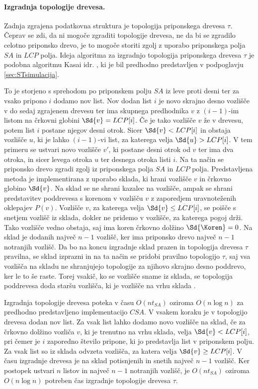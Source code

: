 \paragraph{Izgradnja topologije drevesa.}
Zadnja zgrajena podatkovna struktura je topologija priponskega drevesa $\tau$. Čeprav se zdi, da ni mogoče zgraditi topologije drevesa, ne da bi se zgradilo celotno priponsko drevo, je to mogoče storiti zgolj z uporabo priponskega polja $SA$ in $LCP$ polja. Ideja algoritma za izgradnjo topologija priponskega drevesa $\tau$ je podobna algoritmu Kasai idr. \cite{Kasai2001}, ki je bil predhodno predstavljen v podpoglavju \ref{sec:STsimulacija}.

To je storjeno s sprehodom po priponskem polju $SA$ iz leve proti desni ter za vsako pripono $i$ dodamo nov list. Nov dodan list $i$ je novo skrajno desno vozlišče v do sedaj zgrajenem drevesu ter ima skupnega predhodnika $v$ z $(i-1)$-im listom na črkovni globini $\Sd{v}=LCP[i]$. Če je tako vozlišče $v$ že v drevesu, potem list $i$ postane njegov desni otrok. Sicer $\Sd{v}<LCP[i]$ in obstaja vozlišče $u$, ki je lahko $(i-1)$-vi list, za katerega velja $\Sd{u}>LCP[i]$. V tem primeru se ustvari novo vozlišče $v'$, ki postane desni otrok od $v$ ter ima dva otroka, in sicer levega otroka $u$ ter desnega otroka listi $i$. Na ta način se priponsko drevo zgradi zgolj iz priponskega polja $SA$ in $LCP$ polja. Predstavljena metoda je implementirana z uporabo sklada, ki hrani vozlišče $v$ in črkovno globino $\Sd{v}$. Na sklad se ne shrani kazalec na vozlišče, ampak se shrani predstavitev poddrevesa s korenom v vozlišču $v$ z zaporedjem uravnoteženih oklepajev $P(v)$. Vozlišče $v$, za katerega velja $\Sd{v}\le LCP[i]$, se poišče s snetjem vozlišč iz sklada, dokler ne pridemo v vozlišče, za katerega pogoj drži. Tako vozlišče vedno obstaja, saj ima koren črkovno dolžino $\Sd{\Koren}=0$. Na sklad je dodanih največ $n-1$ vozlišč, ker ima priponsko drevo največ $n-1$ notranjih vozlišč. Da bo na koncu izgradnje sklad prazen in topologija drevesa $\tau$ pravilna, se sklad izprazni in na ta način se pridobi pravilno topologijo $\tau$, saj vsa vozlišča na skladu ne shranjujejo topologije za njihovo skrajno desno poddrevo, ker le to še raste. Torej vsakič, ko se vozlišče sname iz sklada, se topologija poddrevesa doda staršu vozlišča, ki je vozlišče na vrhu sklada \cite{Navarro2016}.

Izgradnja topologije drevesa poteka v času $O(nt_{SA})$ oziroma $O(n\log{n})$ za predhodno predstavljeno implementacijo $CSA$. V vsakem koraku je v topologijo drevesa dodan nov list. Za vsak list lahko dodamo novo vozlišče na sklad, če za črkovno dolžino vozliča $v$, ki je trenutno na vrhu sklada, velja $\Sd{v}<LCP[i]$, pri čemer je $i$ zaporedno število pripone, ki jo predstavlja list v priponskem polju. Za vsak list so iz sklada odvzeta vozlišča, za katera velja $\Sd{v}\ge LCP[i]$. V času izgradnje drevesa je na sklad potisnjenih in snetih največ $n-1$ vozlišč. Ker postopek ustvari $n$ listov in največ $n-1$ notranjih vozlišč, je $O(nt_{SA})$ oziroma $O(n\log{n})$  potreben čas izgradnje topologije drevesa $\tau$.

